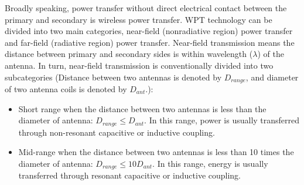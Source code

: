 Broadly speaking, power transfer without direct electrical contact between the primary and secondary is wireless power transfer. WPT technology can be divided into two main categories, near-field (nonradiative region) power transfer and far-field (radiative region) power transfer.
Near-field transmission means the distance between primary and secondary sides is within wavelength ($\lambda$) of the antenna. In turn, near-field transmission is conventionally divided into two subcategories \cite{Wikipedia2021, Chun} (Distance between two antennas is denoted by $D_{range}$, and diameter of two antenna coils is denoted by $D_{ant}$.):
\begin{itemize}
    \item  Short range when the distance between two antennas is less than the diameter of antenna: $D_{range} \leq D_{ant}$.
          In this range, power is usually transferred through non-resonant capacitive or inductive coupling.
    \item Mid-range when the distance between two antennas is less than 10 times the diameter of antenna:  $D_{range} \leq 10 D_{ant}$.
          In this range, energy is usually transferred through resonant capacitive or inductive coupling.
\end{itemize}

